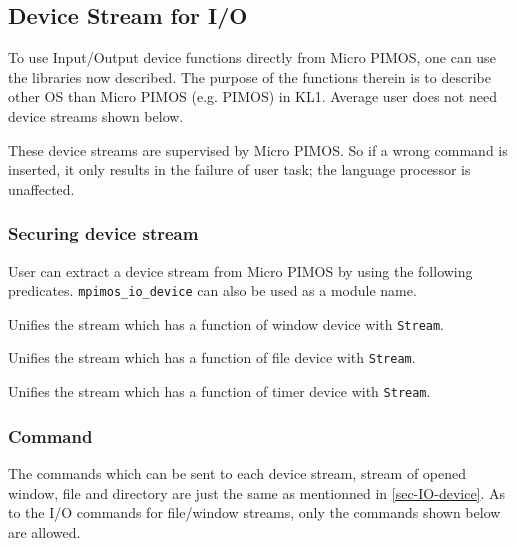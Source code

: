 \subsection{Device Stream for I/O}
\label{sec-MPIMOS-device}

To use Input/Output device functions directly from Micro PIMOS, 
one can use the libraries now described.  The purpose of the functions therein
is to describe other OS than Micro PIMOS (e.g. PIMOS) in KL1.
Average user does not need device streams shown below.

These device streams are supervised by Micro PIMOS. So if a wrong command 
is inserted, it only results in the failure of user task; the language
processor is unaffected.

\subsubsection{Securing device stream}

User can extract a device stream from Micro PIMOS by using the following 
predicates. \verb|mpimos_io_device| can also be used as a module name.

\begin{itemize}

Unifies the stream which has a function of window device with \verb|Stream|.

Unifies the stream which has a function of file device with \verb|Stream|.

Unifies the stream which has a function of timer device with \verb|Stream|.
\end{itemize}

\subsubsection{Command}

The commands which can be sent to each device stream, stream of opened window, 
file and directory are just the same as mentionned in \ref{sec-IO-device}.
As to the I/O commands for file/window streams, only the commands shown 
below are allowed.

